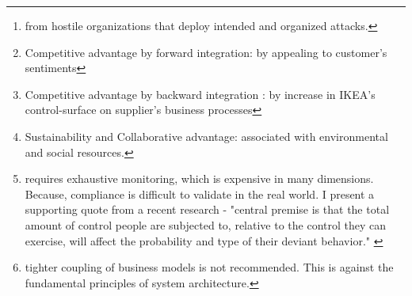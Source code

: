 \documentclass[a4paper, 11pt, margin=1in]{article}
\begin{document}
\renewcommand{\abstractname}{Executive Summary}
\begin{abstract}
\textbf{Short term action:}conduct recurring meetings with Venkat to reach \textbf{mutual agreement}. The agreement would list the top three concerns that resist compliance with IWAY. \textbf{Finer point:}The process of mutual agree must be based on mutual respect \cite{smeltzer1997meaning} and it must be founded on the ideas of exerting purchasing power to force Venkat into compliance. \cite{tittle2018control} \cite{inderst2011countervailing} \\\textbf{Long term strategy:} IWAY policies and practices should be revised to work with consortiums to nutralize threat to IKEA's value chain.\footnote{ from hostile organizations that deploy intended and organized attacks.} \cite{publichearing1998_183}\\
There are \textbf{three main benefits} of redefined relationship between IKEA and its suppliers - \\
\begin{enumerate*}
 \item \textbf{Brand-Image Improved}\footnote{Competitive advantage by forward integration: by appealing to customer's sentiments} ,
 \item \textbf{Cost Savings Improved}\footnote{Competitive advantage by backward integration : by increase in IKEA's control-surface on supplier's business processes},
 \item \textbf{Improved management of risks}\footnote{Sustainability and Collaborative advantage: associated with environmental and social resources.}
\end{enumerate*} \\
Three main concerns that can be raised are - \\
\begin{enumerate*}
 \item \textbf{New cost} to meet the requirements of strict compliance.\footnote{ requires exhaustive monitoring, which is expensive in many dimensions. Because, compliance is difficult to validate in the real world. I present a supporting quote from a recent research - "central premise is that the total amount of control people are subjected to, relative to the control they can exercise, will affect the probability and type of their deviant behavior." \cite{tittle2018control}}
 \item \textbf{Threat to sales:}stronger control on suppliers would affect IKEA's business. \footnote{tighter coupling of business models is not recommended. This is against the fundamental  principles of system architecture.}
 \item \textbf{Accounting liability:}IKEA's business model is tightly coupled with geopolitical dynamics. This is a huge accounting liability in terms of potential litigations.
\end{enumerate*}
\end{abstract}
\end{document}
